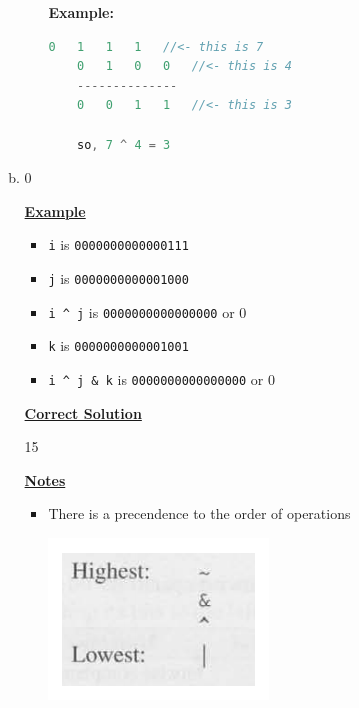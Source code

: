 \documentclass[12pt]{article}
\begin{document}
\begin{enumerate}[1.]
\begin{enumerate}[a)]
\begin{itemize}
            \textbf{Example:}

            \bigskip

    \begin{lstlisting}[language=c]
    0   1   1   1   //<- this is 7
    0   1   0   0   //<- this is 4
    --------------
    0   0   1   1   //<- this is 3

    so, 7 ^ 4 = 3
    \end{lstlisting}
        \end{itemize}

        \item 0

        \bigskip

        \underline{\textbf{Example}}

        \begin{itemize}
            \item \texttt{i} is \texttt{0000000000000111}
            \item \texttt{j} is \texttt{0000000000001000}
            \item \texttt{i \^{} j} is \texttt{0000000000000000} or 0
            \item \texttt{k} is \texttt{0000000000001001}
            \item \texttt{i \^{} j \& k} is \texttt{0000000000000000} or 0
        \end{itemize}

        \bigskip

        \begin{mdframed}
        \underline{\textbf{Correct Solution}}

        \bigskip

        \color{red}15\color{black}
        \end{mdframed}

        \bigskip

        \underline{\textbf{Notes}}

        \begin{itemize}
            \item There is a precendence to the order of operations

            \begin{center}
            \includegraphics[width=0.4\linewidth]{images/review_9_solution_2.png}
            \end{center}
        \end{itemize}


\end{enumerate}
\end{enumerate}
\end{document}
